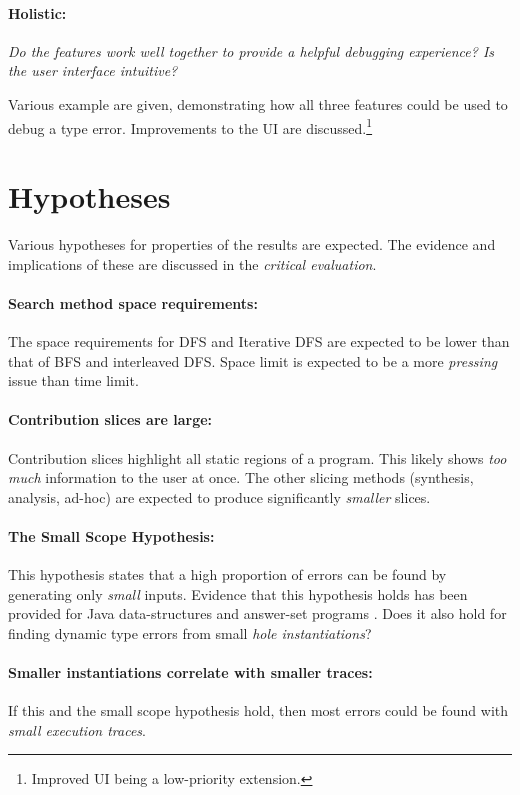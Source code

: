 \paragraph{Holistic: } \textit{Do the features work well together to provide a helpful debugging experience? Is the user interface intuitive?}

Various example are given, demonstrating how all three features could be used to debug a type error. Improvements to the UI are discussed.\footnote{Improved UI being a low-priority extension.} 



\section{Hypotheses}
Various hypotheses for properties of the results are expected. The evidence and implications of these are discussed in the \textit{critical evaluation}.

\paragraph{Search method space requirements: } The space requirements for DFS and Iterative DFS are expected to be lower than that of BFS and interleaved DFS. Space limit is expected to be a more \textit{pressing} issue than time limit.

\paragraph{Contribution slices are large: } Contribution slices highlight all static regions of a program. This likely shows \textit{too much} information to the user at once. The other slicing methods (synthesis, analysis, ad-hoc) are expected to produce significantly \textit{smaller} slices. 

\paragraph{The Small Scope Hypothesis: }
\label{sec:SmallScopeHypothesis} This hypothesis states that a high proportion of errors can be found by generating only \textit{small} inputs. Evidence that this hypothesis holds has been provided for Java data-structures \cite{SmallScopeHypothesis} and answer-set programs \cite{SmallScopeHypothesisAnswerSet}. Does it also hold for finding dynamic type errors from small \textit{hole instantiations}?

\paragraph{Smaller instantiations correlate with smaller traces: } If this and the small scope hypothesis hold, then most errors could be found with \textit{small execution traces}.

